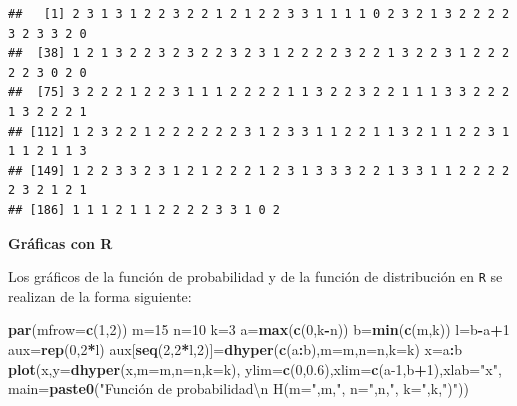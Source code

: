 \documentclass[]{book}
\newenvironment{Shaded}{\begin{snugshade}}{\end{snugshade}}
\newcommand{\CharTok}[1]{\textcolor[rgb]{0.31,0.60,0.02}{#1}}
\newcommand{\DataTypeTok}[1]{\textcolor[rgb]{0.13,0.29,0.53}{#1}}
\newcommand{\DecValTok}[1]{\textcolor[rgb]{0.00,0.00,0.81}{#1}}
\newcommand{\FloatTok}[1]{\textcolor[rgb]{0.00,0.00,0.81}{#1}}
\newcommand{\KeywordTok}[1]{\textcolor[rgb]{0.13,0.29,0.53}{\textbf{#1}}}
\newcommand{\NormalTok}[1]{#1}
\newcommand{\OperatorTok}[1]{\textcolor[rgb]{0.81,0.36,0.00}{\textbf{#1}}}
\newcommand{\StringTok}[1]{\textcolor[rgb]{0.31,0.60,0.02}{#1}}
\begin{document}
\begin{verbatim}
##   [1] 2 3 1 3 1 2 2 3 2 2 1 2 1 2 2 3 3 1 1 1 1 0 2 3 2 1 3 2 2 2 2 3 2 3 3 2 0
##  [38] 1 2 1 3 2 2 3 2 3 2 2 3 2 3 1 2 2 2 2 3 2 2 1 3 2 2 3 1 2 2 2 2 2 3 0 2 0
##  [75] 3 2 2 2 1 2 2 3 1 1 1 2 2 2 2 1 1 3 2 2 3 2 2 1 1 1 3 3 2 2 2 1 3 2 2 2 1
## [112] 1 2 3 2 2 1 2 2 2 2 2 2 3 1 2 3 3 1 1 2 2 1 1 3 2 1 1 2 2 3 1 1 1 2 1 1 3
## [149] 1 2 2 3 3 2 3 1 2 1 2 2 2 1 2 3 1 3 3 3 2 2 1 3 3 1 1 2 2 2 2 2 3 2 1 2 1
## [186] 1 1 1 2 1 1 2 2 2 2 3 3 1 0 2
\end{verbatim}

\textbf{Gráficas con R}

Los gráficos de la función de probabilidad y de la función de distribución en \texttt{R} se realizan de la forma siguiente:

\begin{Shaded}
\begin{Highlighting}[]
\KeywordTok{par}\NormalTok{(}\DataTypeTok{mfrow=}\KeywordTok{c}\NormalTok{(}\DecValTok{1}\NormalTok{,}\DecValTok{2}\NormalTok{))}
\NormalTok{m=}\DecValTok{15}
\NormalTok{n=}\DecValTok{10}
\NormalTok{k=}\DecValTok{3}
\NormalTok{a=}\KeywordTok{max}\NormalTok{(}\KeywordTok{c}\NormalTok{(}\DecValTok{0}\NormalTok{,k}\OperatorTok{-}\NormalTok{n))}
\NormalTok{b=}\KeywordTok{min}\NormalTok{(}\KeywordTok{c}\NormalTok{(m,k))}
\NormalTok{l=b}\OperatorTok{-}\NormalTok{a}\OperatorTok{+}\DecValTok{1}
\NormalTok{aux=}\KeywordTok{rep}\NormalTok{(}\DecValTok{0}\NormalTok{,}\DecValTok{2}\OperatorTok{*}\NormalTok{l)}
\NormalTok{aux[}\KeywordTok{seq}\NormalTok{(}\DecValTok{2}\NormalTok{,}\DecValTok{2}\OperatorTok{*}\NormalTok{l,}\DecValTok{2}\NormalTok{)]=}\KeywordTok{dhyper}\NormalTok{(}\KeywordTok{c}\NormalTok{(a}\OperatorTok{:}\NormalTok{b),}\DataTypeTok{m=}\NormalTok{m,}\DataTypeTok{n=}\NormalTok{n,}\DataTypeTok{k=}\NormalTok{k)}
\NormalTok{x=a}\OperatorTok{:}\NormalTok{b}
\KeywordTok{plot}\NormalTok{(x,}\DataTypeTok{y=}\KeywordTok{dhyper}\NormalTok{(x,}\DataTypeTok{m=}\NormalTok{m,}\DataTypeTok{n=}\NormalTok{n,}\DataTypeTok{k=}\NormalTok{k),}
  \DataTypeTok{ylim=}\KeywordTok{c}\NormalTok{(}\DecValTok{0}\NormalTok{,}\FloatTok{0.6}\NormalTok{),}\DataTypeTok{xlim=}\KeywordTok{c}\NormalTok{(a}\DecValTok{-1}\NormalTok{,b}\OperatorTok{+}\DecValTok{1}\NormalTok{),}\DataTypeTok{xlab=}\StringTok{"x"}\NormalTok{,}
  \DataTypeTok{main=}\KeywordTok{paste0}\NormalTok{(}\StringTok{"Función de probabilidad}\CharTok{\textbackslash{}n}\StringTok{ H(m="}\NormalTok{,m,}\StringTok{", n="}\NormalTok{,n,}\StringTok{", k="}\NormalTok{,k,}\StringTok{")"}\NormalTok{))}

\end{Highlighting}
\end{Shaded}
\end{document}
